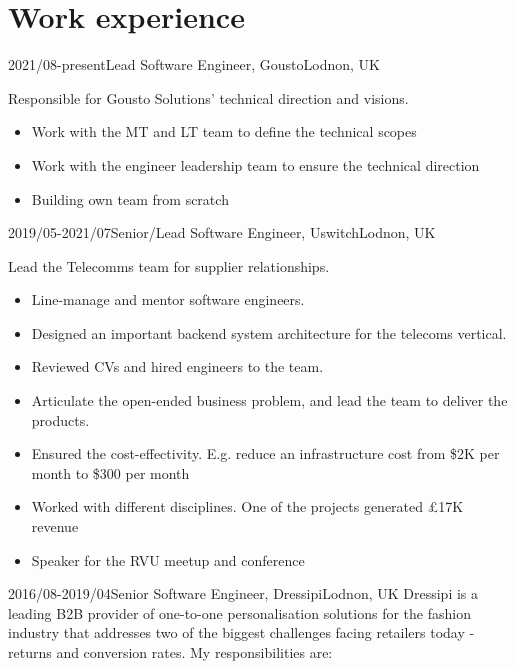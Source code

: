\documentclass[a4paper]{twentysecondcv-english} %
\begin{document}

\section{Work experience}

\begin{twenty} %
	\twentyitem
	    {2021/08-present}{Lead Software Engineer, Gousto}{Lodnon, UK}
    	{Responsible for Gousto Solutions' technical direction and visions.
        	\begin{itemize}
                \item Work with the MT and LT team to define the technical scopes
                \item Work with the engineer leadership team to ensure the technical direction
                \item Building own team from scratch
            \end{itemize}}
	\twentyitem
	    {2019/05-2021/07}{Senior/Lead Software Engineer, Uswitch}{Lodnon, UK}
    	{Lead the Telecomms team for supplier relationships.
        	\begin{itemize}
                \item Line-manage and mentor software engineers.
                \item Designed an important backend system architecture for the telecoms vertical.
                \item Reviewed CVs and hired engineers to the team.
                \item Articulate the open-ended business problem, and lead the team to deliver the products.
                \item Ensured the cost-effectivity. E.g. reduce an infrastructure cost from \$2K per month to \$300 per month
                \item Worked with different disciplines. One of the projects generated £17K revenue
                \item Speaker for the RVU meetup and conference
                \end{itemize}}
	\twentyitem
	    {2016/08-2019/04}{Senior Software Engineer, Dressipi}{Lodnon, UK}
    	{Dressipi is a leading B2B provider of one-to-one personalisation solutions for the fashion industry that addresses two of the biggest challenges facing retailers today - returns and conversion rates. My responsibilities are:
}
\end{twenty}
\end{document}
